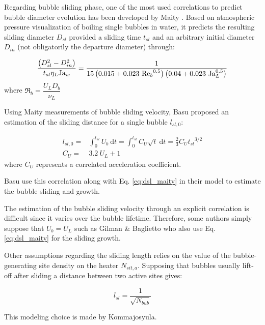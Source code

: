 Regarding bubble sliding phase, one of the most used correlations to predict bubble diameter evolution has been developed by Maity \cite{maity_effect_2000}. Based on atmospheric pressure visualization of boiling single bubbles in water, it predicts the resulting sliding diameter $D_{sl}$ provided a sliding time $t_{sl}$ and an arbitrary initial diameter $D_{in}$ (not obligatorily the departure diameter) through:

\begin{equation}
\frac{\parth{D_{sl}^{2} - D_{in}^{2}} }{t_{sl} \eta_{L} \Ja_{w}} = \frac{1}{15\parth{0.015+0.023\ {\Re_{b}}^{0.5} } \parth{0.04+0.023\ \Ja_{L}^{0.5}} }
\label{eq:dsl_maity}
\end{equation}
where $\Re_{b}=\dfrac{U_{L}D_{b}}{\nu_{L}}$


Using Maity measurements of bubble sliding velocity, Basu \etal proposed an estimation of the sliding distance for a single bubble $l_{sl,0}$:

\begin{align}
l_{sl,0}=& \int_{0}^{t_{sl}} U_{b}\ \mathrm{d}t = \int_{0}^{t_{sl}}C_{U} \sqrt{t}\ \mathrm{d}t =  \frac{2}{3}C_{U}{t_{sl}}^{3/2}
\label{eq:lsl_basu}\\
%
C_{U} =& 3.2\ U_{L}+1
\end{align}
where $C_{U}$ represents a correlated acceleration coefficient.

\begin{note*}{}
Basu \etal use this correlation along with Eq. \ref{eq:dsl_maity} in their model to estimate the bubble sliding and growth.

The estimation of the bubble sliding velocity through an explicit correlation is difficult since it varies over the bubble lifetime. Therefore, some authors simply suppose that $U_{b} = U_{L}$ such as Gilman \& Baglietto who also use Eq. \ref{eq:dsl_maity} for the sliding growth.
\end{note*}


Other assumptions regarding the sliding length relies on the value of the bubble-generating site density on the heater $N_{sit,a}$. Supposing that bubbles usually lift-off after sliding a distance between two active sites gives:

\begin{equation}
l_{sl} = \frac{1}{\sqrt{N_{bub}}}
\label{eq:lsl_avgdist_bub}
\end{equation}

\begin{note*}{}
This modeling choice is made by Kommajosyula.
\end{note*}

